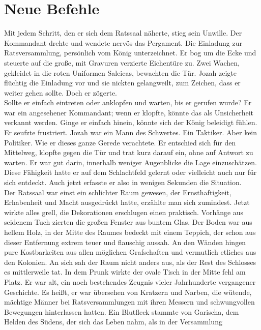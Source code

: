 
\chapter{Neue Befehle}

Mit jedem Schritt, den er sich dem Ratssaal näherte, stieg sein Unwille. Der Kommandant drehte und 
wendete nervös das Pergament. Die Einladung zur Ratsversammlung, persönlich vom König unterzeichnet. 
Er bog um die Ecke und steuerte auf die große, mit Gravuren verzierte Eichentüre zu. Zwei Wachen, 
gekleidet in die roten Uniformen Saleicas, bewachten die Tür. Jozah zeigte flüchtig die Einladung 
vor und sie nickten gelangweilt, zum Zeichen, dass er weiter gehen sollte. Doch er zögerte.\\
 Sollte er einfach eintreten oder anklopfen und warten, bis er gerufen wurde? Er war ein angesehener 
Kommandant; wenn er klopfte, könnte das als Unsicherheit verkannt werden. Ginge er einfach hinein, 
könnte sich der König beleidigt fühlen. Er seufzte frustriert. Jozah war ein Mann des Schwertes. Ein 
Taktiker. Aber kein Politiker. Wie er dieses ganze Gerede verachtete. Er entschied sich für den 
Mittelweg, klopfte gegen die Tür und trat kurz darauf ein, ohne auf Antwort zu warten. Er war gut 
darin, innerhalb weniger Augenblicke die Lage einzuschätzen. Diese Fähigkeit hatte er auf dem 
Schlachtfeld gelernt oder vielleicht auch nur für sich entdeckt. Auch jetzt erfasste er also in 
wenigen Sekunden die Situation.\\
 Der Ratssaal war einst ein schlichter Raum gewesen, der Ernsthaftigkeit, Erhabenheit und Macht 
ausgedrückt hatte, erzählte man sich zumindest. Jetzt wirkte alles grell, die Dekorationen 
erschlugen einen praktisch. Vorhänge aus seidenem Tuch zierten die großen Fenster aus buntem Glas. 
Der Boden war aus hellem Holz, in der Mitte des Raumes bedeckt mit einem Teppich, der schon aus 
dieser Entfernung extrem teuer und flauschig aussah. An den Wänden hingen pure Kostbarkeiten aus 
allen möglichen Grafschaften und vermutlich etliches aus den Kolonien. An sich sah der Raum nicht 
anders aus, als der Rest des Schlosses es mittlerweile tat. In dem Prunk wirkte der ovale Tisch in 
der Mitte fehl am Platz. Er war alt, ein noch bestehendes Zeugnis vieler Jahrhunderte vergangener 
Geschichte. Es heißt, er war übersehen von Kratzern und Narben, die wütende, mächtige Männer bei 
Ratsversammlungen mit ihren Messern und schwungvollen Bewegungen hinterlassen hatten. Ein Blutfleck 
stammte von Garischa, dem Helden des Südens, der sich das Leben nahm, als in der Versammlung 
